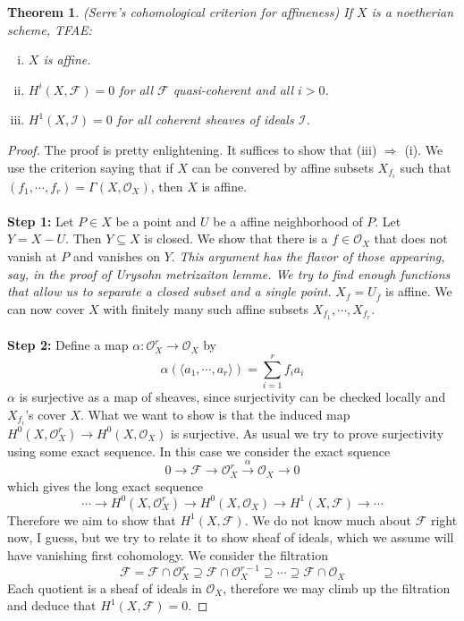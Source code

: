 \documentclass[12pt]{article}
\theoremstyle{plain}
\newtheorem{theorem}[equation]{Theorem}
\theoremstyle{definition}
\newcommand{\sO}{\mathcal{O}}
\newcommand{\shF}{\mathscr{F}}
\newcommand{\shI}{\mathscr{I}}
\newcommand{\<}{\langle}
\renewcommand{\>}{\rangle}
\begin{document}
\begin{theorem}
\emph{(Serre's cohomological criterion for affineness)} If $X$ is a noetherian scheme, TFAE:
\begin{enumerate}[(i)]
\item $X$ is affine.
\item $H^i(X, \shF) = 0$ for all $\shF$ quasi-coherent and all $i > 0$. 
\item $H^1(X, \shI) = 0$ for all coherent sheaves of ideals $\shI$.
\end{enumerate}
\end{theorem}
\begin{proof}
The proof is pretty enlightening. It suffices to show that (iii) $\Rightarrow$ (i). We use the criterion saying that if $X$ can be convered by affine subsets $X_{f_i}$ such that $(f_1, \cdots, f_r) = \Gamma(X, \sO_X)$, then $X$ is affine. \\\\
\textbf{Step 1:} Let $P \in X$ be a point and $U$ be a affine neighborhood of $P$. Let $Y = X - U$. Then $Y \subseteq X$ is closed. We show that there is a $f \in \sO_X$ that does not vanish at $P$ and vanishes on $Y$. \textit{This argument has the flavor of those appearing, say, in the proof of Urysohn metrizaiton lemme. We try to find enough functions that allow us to separate a closed subset and a single point.} $X_f = U_{\bar{f}}$ is affine. We can now cover $X$ with finitely many such affine subsets $X_{f_1}, \cdots, X_{f_r}$. \\\\
\textbf{Step 2:} Define a map $\alpha : \sO_X^r \to \sO_X$ by 
$$ \alpha(\< a_1, \cdots, a_r \>) = \sum_{i = 1}^r f_i a_i $$ 
$\alpha$ is surjective as a map of sheaves, since surjectivity can be checked locally and $X_{f_i}$'s cover $X$. What we want to show is that the induced map $H^0(X, \sO_X^r) \to H^0(X, \sO_X)$ is surjective. As usual we try to prove surjectivity using some exact sequence. In this case we consider the exact squence 
$$ 0 \to \shF \to \sO_X^r \stackrel{\alpha}{\to} \sO_X \to 0 $$
which gives the long exact sequence 
$$ \cdots \to H^0(X, \sO_X^r) \to H^0(X, \sO_X) \to H^1(X, \shF) \to \cdots $$
Therefore we aim to show that $H^1(X, \shF)$. We do not know much about $\shF$ right now, I guess, but we try to relate it to show sheaf of ideals, which we assume will have vanishing first cohomology. We consider the filtration 
$$ \shF = \shF \cap \sO_X^r \supseteq \shF \cap \sO_X^{r - 1} \supseteq \cdots \supseteq \shF \cap \sO_X $$
Each quotient is a sheaf of ideals in $\sO_X$, therefore we may climb up the filtration and deduce that $H^1(X, \shF) = 0$.  
\end{proof}
\end{document}
